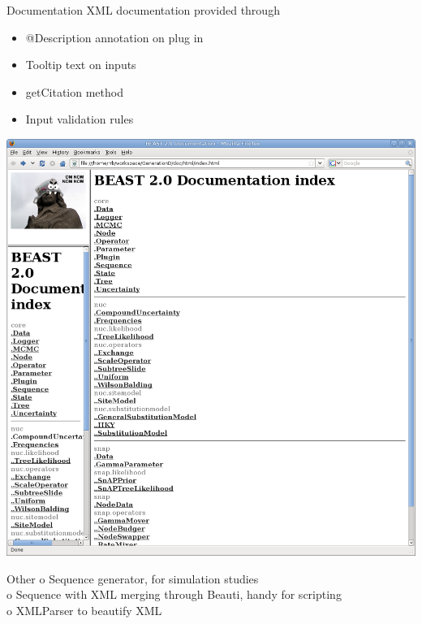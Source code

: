 \documentclass{beamer}
\theoremstyle{definition}
\begin{document}
\begin{frame}{Documentation}
XML documentation provided through

\begin{itemize}
\item @Description annotation on plug in
\item Tooltip text on inputs
\item getCitation method
\item Input validation rules
\end{itemize}

\includegraphics[width=\textwidth]{beastdoc0.png}

\end{frame}


\begin{frame}{Other}
o Sequence generator, for simulation studies\\\vskip0.5cm
o Sequence with XML merging through Beauti, handy for scripting\\\vskip0.5cm
o XMLParser to beautify XML\\\vskip0.5cm
\end{frame}
\end{document}
